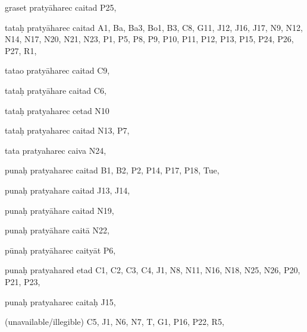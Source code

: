 \begin{ekdosis}
\begin{marma}[hp01_055]
\begin{marma}[hp02_009]
\begin{marma}[hp02_011]
 \begin{marma}[hp02_24c]
\item[graset pratyāharec caitad] P25, 
\item[tataḥ pratyāharec caitad] A1, Ba, Ba3, Bo1, B3, C8, G11, J12, J16, J17, N9, N12, N14, N17, N20, N21, N23, P1, P5, P8, P9, P10, P11, P12, P13, P15, P24, P26, P27, R1,
\item[tatao pratyāharec caitad] C9,
\item[tataḥ pratyāhare caitad] C6,
\item[tataḥ pratyaharec cetad] N10
\item[tataḥ pratyaharec caitad] N13, P7, 
\item[tata pratyaharec caiva] N24,
\item[punaḥ pratyaharec caitad] B1, B2, P2, P14, P17, P18, Tue,
\item[punaḥ pratyahare caitad] J13, J14, 
\item[punaḥ pratyāhare caitad] N19, 
\item[punaḥ pratyāhare caitā] N22,
\item[pūnaḥ pratyāharec caityāt] P6,
\item[punaḥ pratyahared etad] C1, C2, C3, C4, J1, N8, N11, N16, N18, N25, N26, P20, P21, P23, 
\item[punaḥ pratyaharec caitaḥ] J15,
\item[(unavailable/illegible)] C5, J1, N6, N7, T, G1, P16, P22, R5,
  \begin{description}

    \end{description}
 \end{marma}


\end{marma}
\end{marma}
\end{marma}
\end{ekdosis}
